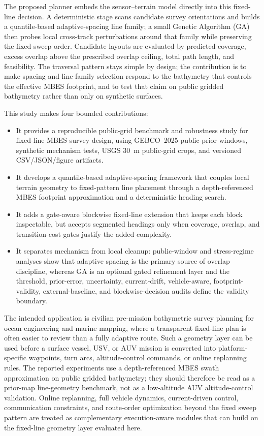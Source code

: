 \documentclass[jmse,article,submit,moreauthors]{Definitions/mdpi}
\begin{document}
The proposed planner embeds the sensor--terrain model directly into this fixed-line decision. A deterministic stage scans candidate survey orientations and builds a quantile-based adaptive-spacing line family; a small Genetic Algorithm (GA) then probes local cross-track perturbations around that family while preserving the fixed sweep order. Candidate layouts are evaluated by predicted coverage, excess overlap above the prescribed overlap ceiling, total path length, and feasibility. The traversal pattern stays simple by design; the contribution is to make spacing and line-family selection respond to the bathymetry that controls the effective MBES footprint, and to test that claim on public gridded bathymetry rather than only on synthetic surfaces.

This study makes four bounded contributions:
\begin{itemize}
    \item It provides a reproducible public-grid benchmark and robustness study for fixed-line MBES survey design, using GEBCO~2025 public-prior windows, synthetic mechanism tests, USGS 30~m public-grid crops, and versioned CSV/JSON/figure artifacts.
    \item It develops a quantile-based adaptive-spacing framework that couples local terrain geometry to fixed-pattern line placement through a depth-referenced MBES footprint approximation and a deterministic heading search.
    \item It adds a gate-aware blockwise fixed-line extension that keeps each block inspectable, but accepts segmented headings only when coverage, overlap, and transition-cost gates justify the added complexity.
    \item It separates mechanism from local cleanup: public-window and stress-regime analyses show that adaptive spacing is the primary source of overlap discipline, whereas GA is an optional gated refinement layer and the threshold, prior-error, uncertainty, current-drift, vehicle-aware, footprint-validity, external-baseline, and blockwise-decision audits define the validity boundary.
\end{itemize}

The intended application is civilian pre-mission bathymetric survey planning for ocean engineering and marine mapping, where a transparent fixed-line plan is often easier to review than a fully adaptive route. Such a geometry layer can be used before a surface vessel, USV, or AUV mission is converted into platform-specific waypoints, turn arcs, altitude-control commands, or online replanning rules. The reported experiments use a depth-referenced MBES swath approximation on public gridded bathymetry; they should therefore be read as a prior-map line-geometry benchmark, not as a low-altitude AUV altitude-control validation. Online replanning, full vehicle dynamics, current-driven control, communication constraints, and route-order optimization beyond the fixed sweep pattern are treated as complementary execution-aware modules that can build on the fixed-line geometry layer evaluated here.
\end{document}
